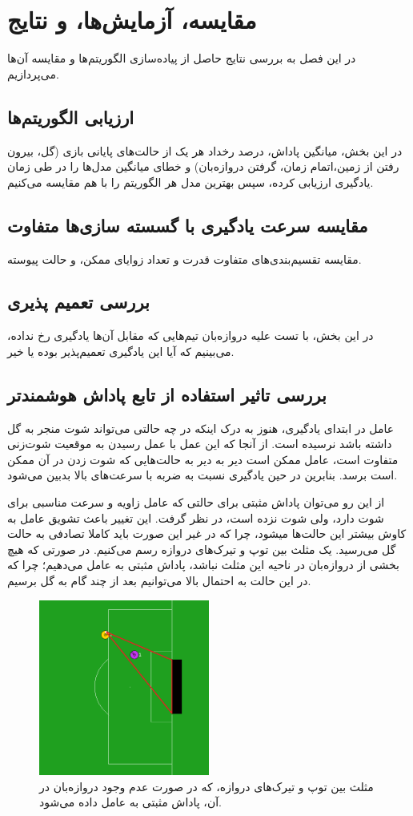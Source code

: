 \chapter{مقایسه، آزمایش‌ها، و نتایج}
در این فصل به بررسی نتایج حاصل از پیاده‌سازی الگوریتم‌ها و مقایسه آن‌ها می‌پردازیم.
\section{ارزیابی الگوریتم‌ها}
در این بخش، میانگین پاداش، درصد رخداد هر یک از حالت‌های پایانی بازی (گل، بیرون رفتن از زمین،اتمام زمان، گرفتن دروازه‌بان)
و خطای میانگین مدل‌ها را در طی زمان یادگیری ارزیابی کرده،
سپس بهترین مدل هر الگوریتم‌ را با هم مقایسه می‌کنیم.
\section{مقایسه سرعت یادگیری با گسسته سازی‌ها متفاوت}
مقایسه تقسیم‌بندی‌های متفاوت قدرت و تعداد زوایای ممکن، و حالت پیوسته.
\section{بررسی تعمیم پذیری}
در این بخش، با تست علیه دروازه‌بان تیم‌هایی که مقابل آن‌ها یادگیری رخ نداده، می‌بینیم که آیا این یادگیری تعمیم‌پذیر بوده یا خیر.
\section{بررسی تاثیر استفاده از تابع پاداش هوشمند‌تر}
عامل در ابتدای یادگیری، هنوز به درک اینکه در چه حالتی می‌تواند شوت منجر به گل داشته باشد نرسیده است.
از آنجا که این عمل با عمل رسیدن به موقعیت شوت‌زنی متفاوت است، عامل ممکن است دیر به دیر به حالت‌هایی که شوت زدن در آن ممکن است برسد.
بنابرین در حین یادگیری نسبت به ضربه با سرعت‌های بالا بدبین می‌شود.

از این رو می‌توان پاداش مثبتی برای حالتی که عامل زاویه و سرعت مناسبی برای شوت دارد، ولی شوت نزده است، در نظر گرفت.
این تغییر باعث تشویق عامل به کاوش بیشتر این حالت‌ها میشود، چرا که در غیر این صورت باید کاملا تصادفی به حالت گل می‌رسید.
یک مثلث بین توپ و تیرک‌های دروازه رسم می‌کنیم. در صورتی که هیچ بخشی از دروازه‌بان در ناحیه این مثلث نباشد، پاداش مثبتی به عامل می‌دهیم؛ چرا که در این حالت به احتمال بالا می‌توانیم بعد از چند گام به گل برسیم.
\begin{figure}
    \centering
    \includegraphics[width=0.5\textwidth]{images/bonus_reward.png}
    \caption{مثلث بین توپ و تیرک‌های دروازه، که در صورت عدم وجود دروازه‌بان در آن، پاداش مثبتی به عامل داده می‌شود.}
    \label{fig:shot_reward}
\end{figure}

